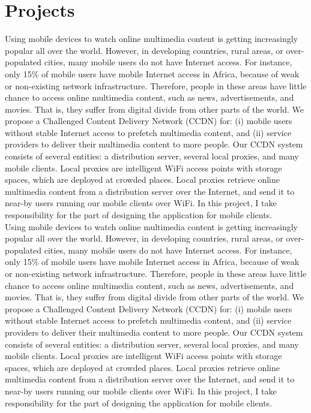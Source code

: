 \section{Projects}
{Using mobile devices to watch online multimedia content is getting increasingly popular all over the world. However, in developing countries, rural areas, or over-populated cities, many mobile users do not have Internet access. For instance, only 15\% of mobile users have mobile Internet access in Africa, because of weak or non-existing network infrastructure. Therefore, people in these areas have little chance to access online multimedia content, such as news, advertisements, and movies. That is, they suffer from digital divide from other parts of the world. We propose a Challenged Content Delivery Network (CCDN) for: (i) mobile users without stable Internet access to prefetch multimedia content, and (ii) service providers to deliver their multimedia content to more people. Our CCDN system consists of several entities: a distribution server, several local proxies, and many mobile clients. Local proxies are intelligent WiFi access points with storage spaces, which are deployed at crowded places. Local proxies retrieve online multimedia content from a distribution server over the Internet, and send it to near-by users running our mobile clients over WiFi. In this project, I take responsibility for the part of designing the application for mobile clients.}\\
{Using mobile devices to watch online multimedia content is getting increasingly popular all over the world. However, in developing countries, rural areas, or over-populated cities, many mobile users do not have Internet access. For instance, only 15\% of mobile users have mobile Internet access in Africa, because of weak or non-existing network infrastructure. Therefore, people in these areas have little chance to access online multimedia content, such as news, advertisements, and movies. That is, they suffer from digital divide from other parts of the world. We propose a Challenged Content Delivery Network (CCDN) for: (i) mobile users without stable Internet access to prefetch multimedia content, and (ii) service providers to deliver their multimedia content to more people. Our CCDN system consists of several entities: a distribution server, several local proxies, and many mobile clients. Local proxies are intelligent WiFi access points with storage spaces, which are deployed at crowded places. Local proxies retrieve online multimedia content from a distribution server over the Internet, and send it to near-by users running our mobile clients over WiFi. In this project, I take responsibility for the part of designing the application for mobile clients.}\\


